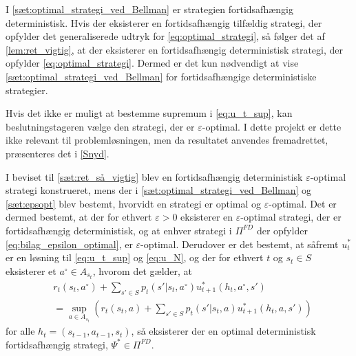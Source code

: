 I \autoref{sæt:optimal_strategi_ved_Bellman} er strategien fortidsafhængig deterministisk. Hvis der eksisterer en fortidsafhængig tilfældig strategi, der opfylder det generaliserede udtryk for \eqref{eq:optimal_strategi}, så følger det af \autoref{lem:ret_vigtig}, at der eksisterer en fortidsafhængig deterministisk strategi, der opfylder \eqref{eq:optimal_strategi}. Dermed er det kun nødvendigt at vise \autoref{sæt:optimal_strategi_ved_Bellman} for fortidsafhængige deterministiske strategier. 






Hvis det ikke er muligt at bestemme supremum i \eqref{eq:u_t_sup}, kan beslutningstageren vælge den strategi, der er $\varepsilon$-optimal. I dette projekt er dette ikke relevant til problemløsningen, men da resultatet anvendes fremadrettet, præsenteres det i \autoref{Snyd}.

I beviset til \autoref{sæt:ret_så_vigtig} blev en fortidsafhængig deterministisk $\varepsilon$-optimal strategi konstrueret, mens der i \autoref{sæt:optimal_strategi_ved_Bellman} og \autoref{sæt:epsopt} blev bestemt, hvorvidt en strategi er optimal og $\varepsilon$-optimal. Det er dermed bestemt, at der for ethvert $\varepsilon> 0$ eksisterer en $\varepsilon$-optimal strategi, der er fortidsafhængig deterministisk, og at enhver strategi i $\Pi^{FD}$ der opfylder \eqref{eq:bilag_epsilon_optimal}, er $\varepsilon$-optimal. Derudover er det bestemt, at såfremt $u_t^*$ er en løsning til \eqref{eq:u_t_sup} og \eqref{eq:u_N}, og der for ethvert $t$ og $s_t\in S$ eksisterer et $a^{\circ}\in A_{s_t}$, hvorom det gælder, at
%
\begin{align}\label{eq:deterministisk_fortidsafhængig_sup}
    &r_t(s_t,a^{\circ}) + \sum_{s'\in S}p_t(s' | s_t,a^{\circ})u^*_{t+1}(h_t, a^{\circ},s')\nonumber \\
    &= \sup_{a \in A_{s_t}}\left(r_t(s_t,a) +  \sum_{s'\in S}p_t(s' | s_t,a)u^*_{t+1}(h_t, a,s')\right)
\end{align}
for alle $h_t=(s_{t-1}, a_{t-1}, s_t)$, så eksisterer der en optimal deterministisk fortidsafhængig strategi, $\Psi^*\in \Pi^{FD}$.

